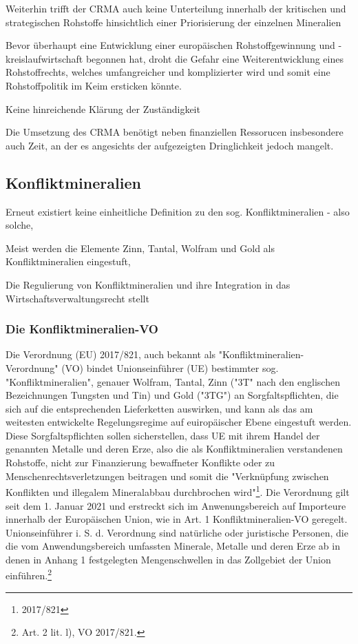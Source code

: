 \documentclass[12pt,a4paper,oneside]{book} %
\begin{document}
Weiterhin trifft der CRMA auch keine Unterteilung innerhalb der kritischen und strategischen Rohstoffe hinsichtlich einer Priorisierung der einzelnen Mineralien

Bevor überhaupt eine Entwicklung einer europäischen Rohstoffgewinnung und -kreislaufwirtschaft begonnen hat, droht die Gefahr eine Weiterentwicklung eines Rohstoffrechts, welches umfangreicher und komplizierter wird und somit eine Rohstoffpolitik im Keim ersticken könnte.

Keine hinreichende Klärung der Zuständigkeit

Die Umsetzung des CRMA benötigt neben finanziellen Ressorucen insbesondere auch Zeit, an der es angesichts der aufgezeigten Dringlichkeit jedoch mangelt.

\subsection{Konfliktmineralien}
Erneut existiert keine einheitliche Definition zu den sog. Konfliktmineralien - also solche, 

Meist werden die Elemente Zinn, Tantal, Wolfram und Gold als Konfliktmineralien eingestuft, 

Die Regulierung von Konfliktmineralien und ihre Integration in das Wirtschaftsverwaltungsrecht stellt 

\subsubsection{Die Konfliktmineralien-VO}
Die Verordnung (EU) 2017/821, auch bekannt als "Konfliktmineralien-Verordnung" (VO) bindet Unionseinführer (UE) bestimmter sog. "Konfliktmineralien", genauer Wolfram, Tantal, Zinn ("3T" nach den englischen Bezeichnungen Tungsten und Tin) und Gold ("3TG") an Sorgfaltspflichten, die sich auf die entsprechenden Lieferketten auswirken, und kann als das am weitesten entwickelte Regelungsregime auf euiropäischer Ebene eingestuft werden\autocite{Kalls, ZfPW 2024, 181, 199}. Diese Sorgfaltspflichten sollen sicherstellen, dass UE mit ihrem Handel der genannten Metalle und deren Erze, also die als Konfliktmineralien verstandenen Rohstoffe, nicht zur Finanzierung bewaffneter Konflikte oder zu Menschenrechtsverletzungen beitragen und somit die "Verknüpfung zwischen Konflikten und illegalem Mineralabbau durchbrochen wird"\footnote{2017/821}. Die Verordnung gilt seit dem 1. Januar 2021 und erstreckt sich im Anwenungsbereich auf Importeure innerhalb der Europäischen Union, wie in Art. 1 Konfliktmineralien-VO geregelt. Unionseinführer i. S. d. Verordnung sind natürliche oder juristische Personen, die die vom Anwendungsbereich umfassten Minerale, Metalle und deren Erze ab in denen in Anhang 1 festgelegten Mengenschwellen in das Zollgebiet der Union einführen.\footnote{Art. 2 lit. l), VO 2017/821.} 
\end{document}
